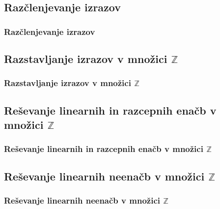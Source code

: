     \subsection{Razčlenjevanje izrazov}

        \begin{frame}
            \frametitle{Razčlenjevanje izrazov}
        \end{frame}

    \subsection{Razstavljanje izrazov v množici $\mathbb{Z}$}

        \begin{frame}
            \frametitle{Razstavljanje izrazov v množici $\mathbb{Z}$}
        \end{frame}

    \subsection{Reševanje linearnih in razcepnih enačb v množici $\mathbb{Z}$}

        \begin{frame}
            \frametitle{Reševanje linearnih in razcepnih enačb v množici $\mathbb{Z}$}
        \end{frame}

    \subsection{Reševanje linearnih neenačb v množici $\mathbb{Z}$}

        \begin{frame}
            \frametitle{Reševanje linearnih neenačb v množici $\mathbb{Z}$}
        \end{frame}
